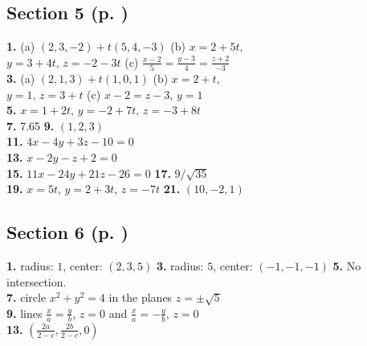 \begin{multicols}{2}
\subsection*{Section 5 (p. \pageref{ssec1dot5})}
\textbf{1.} (a) $(2,3,-2) + t(5,4,-3)$ \quad (b) $x = 2 + 5t,$\\$y = 3 + 4t, \, z = -2 - 3t$ \quad (c) $\frac{x - 2}{5} =
\frac{y - 3}{4} = \frac{z + 2}{-3}$\\\textbf{3.} (a) $(2,1,3) + t(1,0,1)$ \quad (b) $x = 2 + t,$\\$y = 1, \, z = 3 + t$
\quad (c) $x - 2 = z - 3, \, y = 1$\\\textbf{5.} $x = 1 + 2t, \, y = -2 + 7t, \, z = -3 + 8t$\\\textbf{7.} 7.65 \quad
\textbf{9.} $(1,2,3)$\\\textbf{11.} $4x - 4y + 3z - 10 = 0$\\\textbf{13.} $x - 2y - z + 2 = 0$\\\textbf{15.}
$11x - 24y + 21z - 26 = 0$ \quad \textbf{17.} $9/\sqrt{35}$\\\textbf{19.} $x = 5t$, $y = 2 + 3t$, $z = -7t$
\quad \textbf{21.} $(10,-2,1)$
\subsection*{Section 6 (p. \pageref{ssec1dot6})}
\textbf{1.} radius: $1$, center: $(2,3,5)$ \quad \textbf{3.} radius: $5$, center: $(-1,-1,-1)$ \quad \textbf{5.} No
intersection.\\\textbf{7.} circle $x^2 + y^2 = 4$ in the planes $z = \pm \sqrt{5}$\\\textbf{9.} lines
$\frac{x}{a} = \frac{y}{b}$, $z = 0$ and $\frac{x}{a} = -\frac{y}{b}$, $z = 0$\\\textbf{13.}
$\left( \frac{2a}{2 - c}, \frac{2b}{2 - c}, 0 \right)$

\end{multicols}
